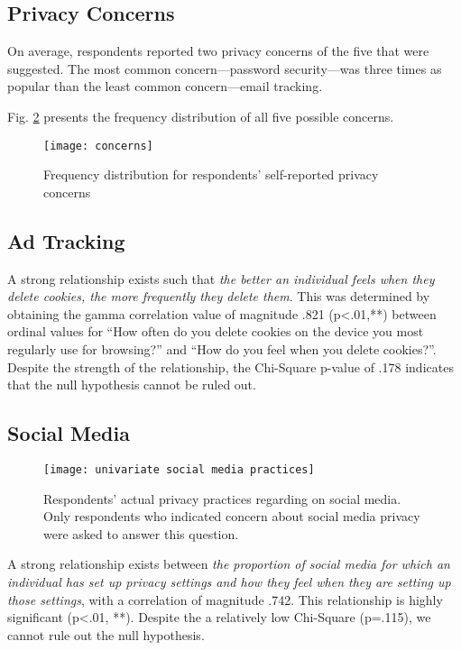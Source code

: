 \documentclass[acmtog]{acmart}
\begin{document}
\subsection{Privacy Concerns} \label{Privacy Concerns}
On average, respondents reported two privacy concerns of the five that were
suggested. The most common concern---password security---was three times as
popular than the least common concern---email tracking.

Fig. \ref{Univariate Distribution Respondent Concerns} presents the frequency
distribution of all five possible concerns.

\begin{figure}[H]
    \texttt{[image: concerns]}
    \caption{Frequency distribution for respondents' self-reported privacy
    concerns}
    \label{Univariate Distribution Respondent Concerns}
\end{figure}

\subsection{Ad Tracking} \label{Ad Tracking}
A strong relationship exists such that \emph{the better an individual feels when
they delete cookies, the more frequently they delete them}. This was determined
by obtaining the gamma correlation value of magnitude .821 (p<.01,**) between
ordinal values for ``How often do you delete cookies on the device you most
regularly use for browsing?'' and ``How do you feel when you delete cookies?''.
Despite the strength of the relationship, the Chi-Square p-value of .178
indicates that the null hypothesis cannot be ruled out.

\subsection{Social Media} \label{Social Media}

\begin{figure}[H]
    \texttt{[image: univariate social media practices]}
    \caption{Respondents' actual privacy practices regarding on social media.
	Only respondents who indicated concern about social media privacy were
	asked to answer this question.}
    \label{Univariate Distribution Respondent Concerns}
\end{figure}

A strong relationship exists between \emph{the proportion of social media for
which an individual has set up privacy settings and how they feel when they are
setting up those settings}, with a correlation of magnitude .742. This
relationship is highly significant (p<.01, **). Despite the a relatively low
Chi-Square (p=.115), we cannot rule out the null hypothesis.
\end{document}
